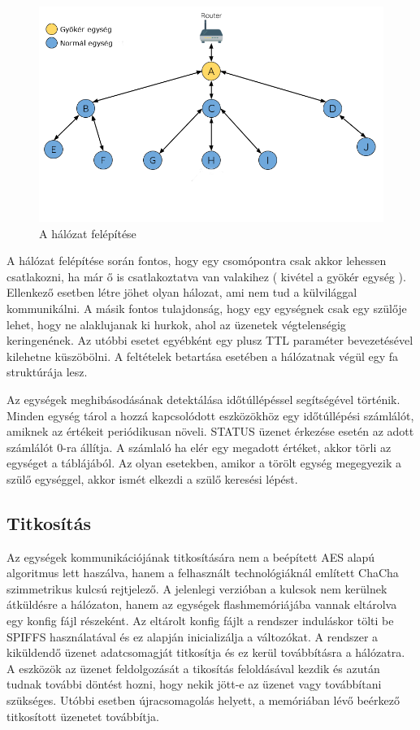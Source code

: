 \begin{figure}[!ht]
    \centering
    \includegraphics[width=150mm, keepaspectratio]{figures/mesh.png}
    \caption{A hálózat felépítése  }
    \label{fig:mesh_network}
\end{figure}


A hálózat felépítése során fontos, hogy egy csomópontra csak akkor lehessen csatlakozni, ha már ő is csatlakoztatva van valakihez ( kivétel a gyökér egység ). Ellenkező esetben létre jöhet olyan hálozat, ami nem tud a külvilággal kommunikálni. A másik fontos tulajdonság, hogy egy egységnek csak egy szülője lehet, hogy ne alaklujanak ki hurkok, ahol az üzenetek végtelenségig keringenének. Az utóbbi esetet egyébként egy plusz TTL paraméter bevezetésével kilehetne küszöbölni. A feltételek betartása esetében a hálózatnak végül egy fa struktúrája lesz.

Az egységek meghibásodásának detektálása időtúllépéssel segítségével történik. Minden egység tárol a hozzá kapcsolódott eszközökhöz egy időtúllépési számlálót, amiknek az értékeit periódikusan növeli. STATUS üzenet érkezése esetén az adott számlálót 0-ra állítja. A számlaló ha elér egy megadott értéket, akkor törli az egységet a táblájából. Az olyan esetekben, amikor a törölt egység megegyezik a szülő egységgel, akkor ismét elkezdi a szülő keresési lépést.

\subsection{Titkosítás}
Az egységek kommunikációjának titkosítására nem a beépített AES alapú algoritmus lett haszálva, hanem a felhasznált technológiáknál említett ChaCha szimmetrikus kulcsú rejtjelező. A jelenlegi verzióban a kulcsok nem kerülnek átküldésre a hálózaton, hanem az egységek flashmemóriájába vannak eltárolva egy konfig fájl részeként. Az eltárolt konfig fájlt a rendszer induláskor tölti be SPIFFS használatával és ez alapján inicializálja a változókat.
A rendszer a kiküldendő üzenet adatcsomagját titkosítja és ez kerül továbbításra a hálózatra. A eszközök az üzenet feldolgozását a tikosítás feloldásával kezdik és azután tudnak további döntést hozni, hogy nekik jött-e az üzenet vagy továbbítani szükséges. Utóbbi esetben újracsomagolás helyett, a memóriában lévő beérkező titkosított üzenetet továbbítja.
